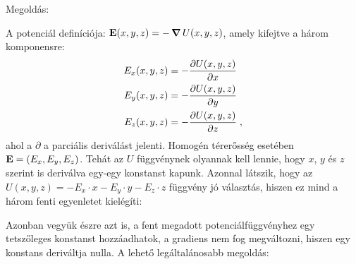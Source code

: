 
\ifdefined\megoldas
  
 Megoldás: 

 A potenciál definíciója: $\mathbf{E}(x,y,z)=-\mathop{\boldsymbol{\nabla}}\nolimits U(x,y,z)$, amely kifejtve a három komponensre:
 \begin{align}
  E_x(x,y,z)&=-\frac{\partial U(x,y,z)}{\partial x}\\
  E_y(x,y,z)&=-\frac{\partial U(x,y,z)}{\partial y}\\
  E_z(x,y,z)&=-\frac{\partial U(x,y,z)}{\partial z}\;,
 \end{align}
 ahol a $\partial$ a parciális deriválást jelenti. Homogén térerősség esetében $\mathbf{E}=(E_x,E_y,E_z)$. Tehát az $U$ függvénynek olyannak kell lennie, hogy $x$, $y$ és $z$ szerint is deriválva egy-egy konstanst kapunk. Azonnal látszik, hogy az $U(x,y,z)=-E_x\cdot x-E_y\cdot y-E_z\cdot z$ függvény jó választás, hiszen ez mind a három fenti egyenletet kielégíti:

 Azonban vegyük észre azt is, a fent megadott potenciálfüggvényhez egy tetszőleges konstanst hozzáadhatok, a gradiens nem fog megváltozni, hiszen egy konstans deriváltja nulla. A lehető legáltalánosabb megoldás:
 
\fi